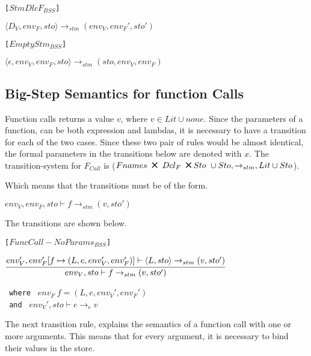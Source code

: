 \texttt{[$StmDlcF_{BSS}$]}
\begin{center}
	$\langle D_V, env_F, sto \rangle \rightarrow_{stm} (env_V, env_F', sto')$
\end{center}

\texttt{[$EmptyStm_{BSS}$]}
\begin{center}
	\begin{math}
	{\langle \epsilon, env_V, env_F, sto \rangle \rightarrow_{stm} (sto, env_V, env_F)}
	\end{math}
\end{center}

\subsection{Big-Step Semantics for function Calls}
Function calls returns a value $v$, where $v \in Lit \cup {none}$.
Since the parameters of a function, can be both expression and lambdas, it is necessary to have a transition for each of the two cases.
Since these two pair of rules would be almost identical, the formal parameters in the transitions below are denoted with $x$.
The transition-system for $F_{Call}$ is ($Fnames\ \Cross\ Dcl_F\ \Cross Sto\ \cup Sto, \rightarrow_{stm}, Lit \cup Sto$).

Which means that the transitions must be of the form.
\begin{center}
	$env_V, env_F, sto \vdash f \rightarrow_{stm} (v, sto')$
\end{center}
The transitions are shown below.

\texttt{[$FuncCall-NoParams_{BSS}$]}
\begin{center}
	\begin{math}
	\cfrac
		{env_V', env_F'[f \mapsto (L, e, env_V', env_F')] \vdash \langle L, sto \rangle \rightarrow_{stm} (v, sto')}
		{env_V, sto \vdash f \rightarrow_{stm} (v, sto')}
	\end{math}
	
	\texttt{ where } $env_F\ f = (L, e, env_V', env_F')$\\
	\texttt{ and } $ env_V', sto \vdash e \rightarrow_{e} v$\\
\end{center}

The next transition rule, explains the semantics of a function call with one or more arguments.
This means that for every argument, it is necessary to bind their values in the store.

